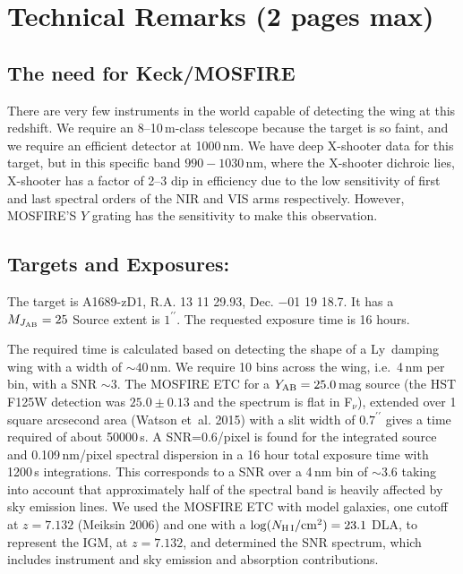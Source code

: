 \documentclass[letter,12pt]{article}
\newcommand{\lya}{Ly\textalpha}
\begin{document}
\clearpage



\clearpage

\section{Technical Remarks (2 pages max)}

\subsection{The need for Keck/MOSFIRE}

There are very few instruments in the world capable of detecting the wing at
this redshift.  We require an 8--10\,m-class telescope because the target is so
faint, and we require an efficient detector at 1000\,nm. We have deep X-shooter
data for this target, but in this specific band \(990-1030\)\,nm, where the
X-shooter dichroic lies, X-shooter has a factor of 2--3 dip in efficiency due to
the low sensitivity of first and last spectral orders of the NIR and VIS arms
respectively. However, MOSFIRE'S \(Y\) grating has the sensitivity to make this
observation.


\subsection{Targets and Exposures:}

The target is A1689-zD1, R.A. 13 11 29.93, Dec. \(-\)01 19 18.7. It has a
\(M_{J_{\rm AB}} = 25\) Source extent is \(1^{\prime\prime}\). The requested
exposure time is 16 hours.

The required time is calculated based on detecting the shape of a \lya\ damping
wing with a width of \(\sim40\)\,nm.  We require 10 bins across the wing, i.e.\
4\,nm per bin, with a SNR \(\sim3\).  The MOSFIRE ETC for a \(Y_{\rm
AB}=25.0\)\,mag source (the HST F125W detection was \(25.0\pm0.13\) and the
spectrum is flat in F\(_\nu\)), extended over 1\,square arcsecond area (Watson
et~al. 2015) with a slit width of \(0.7^{\prime\prime}\) gives a time required of about
50000\,s. A SNR=0.6/pixel is found for the integrated source and 0.109\,nm/pixel
spectral dispersion in a 16 hour total exposure time with 1200\,s integrations.
This corresponds to a SNR over a 4\,nm bin of \(\sim3.6\) taking into account
that approximately half of the spectral band is heavily affected by sky emission
lines. We used the MOSFIRE ETC with model galaxies, one cutoff at
\(z=7.132\) (Meiksin 2006) and one with a \(\log(N_{{\rm H\,I}}/{\rm
cm}^2)=23.1\) DLA, to represent the IGM, at \(z=7.132\), and determined the SNR
spectrum, which includes instrument and sky emission and absorption
contributions.
\end{document}
